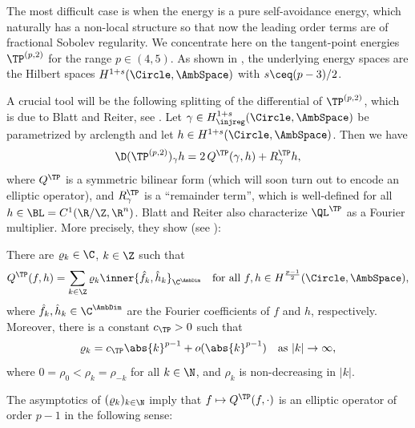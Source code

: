 The most difficult case is when the energy is a pure self-avoidance energy,
which naturally has a non-local structure so that now the leading order
terms are of fractional Sobolev regularity. We 
concentrate here on the tangent-point energies $\TP^{(p,2)}$ for
the range $p\in (4,5)$. 
As shown in \cite[Theorem 1.1]{blatt-reiter_2015a},
the underlying energy spaces are the Hilbert
spaces $H^{1+s}(\Circle,\AmbSpace)$ with $s \ceq (p-3)/2$.

A crucial tool will be the following splitting of the differential of $\TP^{(p,2)}$,
which is due to Blatt and Reiter, see \cite{blatt-reiter_2015a}.
Let $\gamma \in H^{1+s}_\injreg(\Circle,\AmbSpace)$ be parametrized by arclength
and let $h \in H^{1+s}(\Circle,\AmbSpace)$.
Then we have
\begin{equation}
    \D(\TP^{(p,2)})_\gamma h 
    =
    2 \, Q^{\TP}(\gamma,h) + R^{\TP}_\gamma h,
    \label{eq:splitting-TP}
\end{equation}
where $Q^{\TP}$ is a symmetric bilinear form (which will soon turn out to encode an elliptic operator), and $R^{\TP}_{\gamma}$ is a ``remainder term'', which is well-defined for all $ h\in \BL=C^1(\R/\Z,\R^n) $.
Blatt and Reiter also characterize $\QL^{\TP}$ as a Fourier multiplier.
More precisely, they show (see \cite[Proposition~4.1 and its proof]{blatt-reiter_2015a}):
\begin{proposition}\label{lem:fourier-Q}
        There are $\varrho_k \in \C$, $k \in \Z$ such that 
        \[
                Q^{\TP}(f,h)
                =
                \sum_{k \in \Z} \varrho_k \inner{ \hat f_k, \hat h_k }_{\C^\AmbDim}
                \quad 
                \text{for all $f,h \in H^{\frac{p-1}{2}}(\Circle,\AmbSpace)$}
                ,
        \]      
        where $\hat{f}_k,\hat{h}_k \in \C^\AmbDim$ are the Fourier coefficients of $f$ and $h$, respectively.
        Moreover, there is a constant $c_{\TP} > 0$ such that 
        \[
                \varrho_k = c_{\TP} \abs{k}^{p-1} + o(\abs{k}^{p-1})
                \quad 
                \text{as $\left| k \right|\to \infty$,}
        \]
        where $ 0=\rho_0<\rho_{k}=\rho_{-k} $ for all $ k\in \N $, and $ \rho_{k} $ is non-decreasing in $ \left|k \right| $. 
\end{proposition}
The asymptotics of $(\varrho_k)_{k \in \N}$ imply that $f \mapsto Q^{\TP}(f,\cdot)$ is an elliptic operator of order $p-1$ in the following sense:

